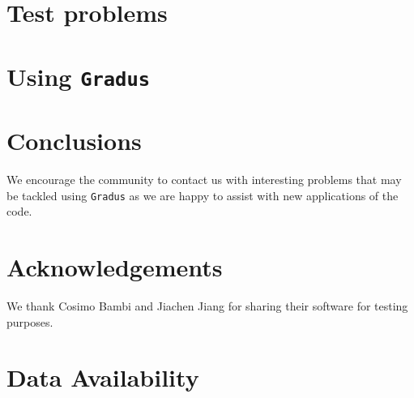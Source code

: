 \documentclass[fleqn,usenatbib]{mnras}
\begin{document}

\section{Test problems}


\section{Using {\tt Gradus}}


\section{Conclusions}

We encourage the community to contact us with interesting problems that may be tackled using {\tt Gradus} as we are happy to assist with new applications of the code.


\section*{Acknowledgements}

We thank Cosimo Bambi and Jiachen Jiang for sharing their software for testing purposes.

\section*{Data Availability}

 
\end{document}
